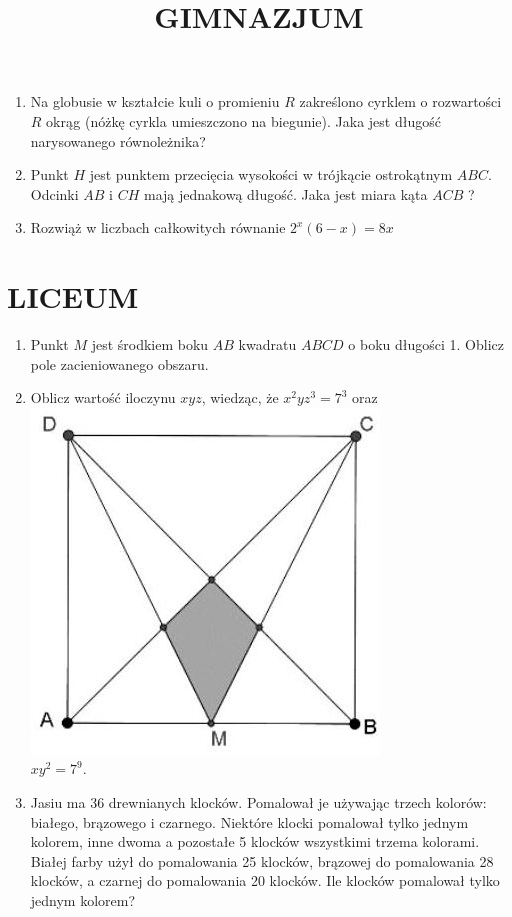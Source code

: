 \documentclass[10pt]{article}
\title{GIMNAZJUM }
\author{}
\date{}
\begin{document}
\maketitle
\begin{enumerate}
  \item Na globusie w kształcie kuli o promieniu \(R\) zakreślono cyrklem o rozwartości \(R\) okrąg (nóżkę cyrkla umieszczono na biegunie). Jaka jest długość narysowanego równoleżnika?
  \item Punkt \(H\) jest punktem przecięcia wysokości w trójkącie ostrokątnym \(A B C\). Odcinki \(A B\) i \(C H\) mają jednakową długość. Jaka jest miara kąta \(A C B\) ?
  \item Rozwiąż w liczbach całkowitych równanie \(2^{x}(6-x)=8 x\)
\end{enumerate}

\section*{LICEUM}
\begin{enumerate}
  \item Punkt \(M\) jest środkiem boku \(A B\) kwadratu \(A B C D\) o boku długości 1. Oblicz pole zacieniowanego obszaru.
  \item Oblicz wartość iloczynu \(x y z\), wiedząc, że \(x^{2} y z^{3}=7^{3}\) oraz\\
\includegraphics[max width=\textwidth, center]{2024_11_21_22b13a6aca32b5fedbe5g-1}\\
\(x y^{2}=7^{9}\).
  \item Jasiu ma 36 drewnianych klocków. Pomalował je używając trzech kolorów: białego, brązowego i czarnego. Niektóre klocki pomalował tylko jednym kolorem, inne dwoma a pozostałe 5 klocków wszystkimi trzema kolorami. Białej farby użył do pomalowania 25 klocków, brązowej do pomalowania 28 klocków, a czarnej do pomalowania 20 klocków. Ile klocków pomalował tylko jednym kolorem?
\end{enumerate}
\end{document}
